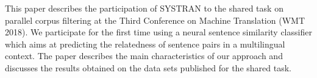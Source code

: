 This paper describes the participation of SYSTRAN to the shared task on parallel corpus filtering at the Third Conference on Machine Translation (WMT 2018). We participate for the first time using a neural sentence similarity classifier which aims at predicting the relatedness of sentence pairs in a multilingual context. The paper describes the main characteristics of our approach and discusses the results obtained on the data sets published for the shared task.
